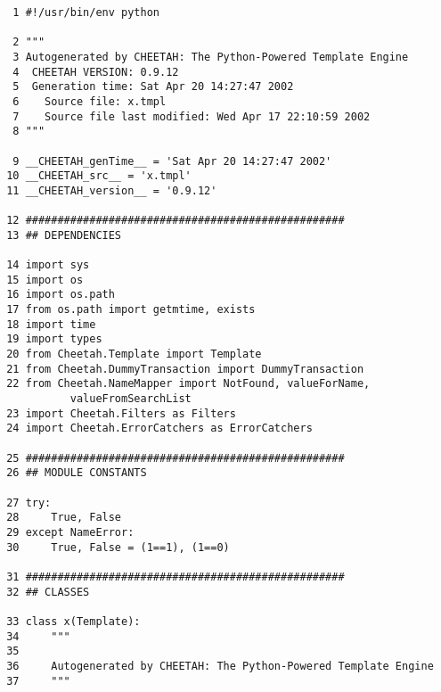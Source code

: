 \begin{verbatim}
  1	#!/usr/bin/env python
    
  2	"""
  3	Autogenerated by CHEETAH: The Python-Powered Template Engine
  4	 CHEETAH VERSION: 0.9.12
  5	 Generation time: Sat Apr 20 14:27:47 2002
  6	   Source file: x.tmpl
  7	   Source file last modified: Wed Apr 17 22:10:59 2002
  8	"""
    
  9	__CHEETAH_genTime__ = 'Sat Apr 20 14:27:47 2002'
 10	__CHEETAH_src__ = 'x.tmpl'
 11	__CHEETAH_version__ = '0.9.12'
    
 12	##################################################
 13	## DEPENDENCIES
    
 14	import sys
 15	import os
 16	import os.path
 17	from os.path import getmtime, exists
 18	import time
 19	import types
 20	from Cheetah.Template import Template
 21	from Cheetah.DummyTransaction import DummyTransaction
 22	from Cheetah.NameMapper import NotFound, valueForName, 
           valueFromSearchList
 23	import Cheetah.Filters as Filters
 24	import Cheetah.ErrorCatchers as ErrorCatchers
    
 25	##################################################
 26	## MODULE CONSTANTS
    
 27	try:
 28	    True, False
 29	except NameError:
 30	    True, False = (1==1), (1==0)
    
 31	##################################################
 32	## CLASSES
    
 33	class x(Template):
 34	    """
 35	    
 36	    Autogenerated by CHEETAH: The Python-Powered Template Engine
 37	    """
\end{verbatim}

